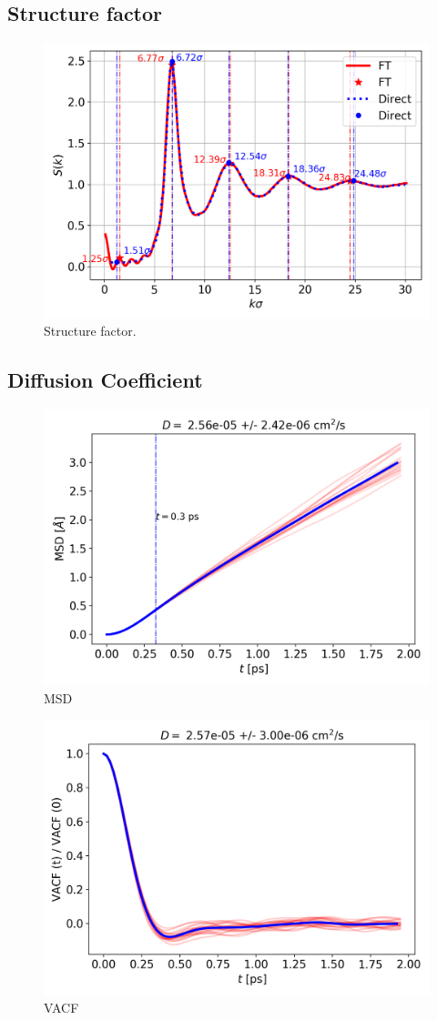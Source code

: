 \documentclass[%
aip,
jmp,%
amsmath,amssymb,
preprint,%
reprint,%
notitlepage,
a4paper]{revtex4-1}
\begin{document}
\subsection{Structure factor}
\begin{figure}
	\centering
	\includegraphics[width=0.9\linewidth]{../task2/results/sofk}
	\caption{Structure factor.}
	\label{fig:sofk}
\end{figure}

\subsection{Diffusion Coefficient}
\begin{figure}
	\centering
	\includegraphics[width=0.9\linewidth]{../task2/results/msdvst}
	\caption{MSD}
	\label{fig:msdvst}
\end{figure}

\begin{figure}
	\centering
	\includegraphics[width=0.9\linewidth]{../task2/results/vacfvst}
	\caption{VACF}
	\label{fig:vacfvst}
\end{figure}




	
\end{document}
